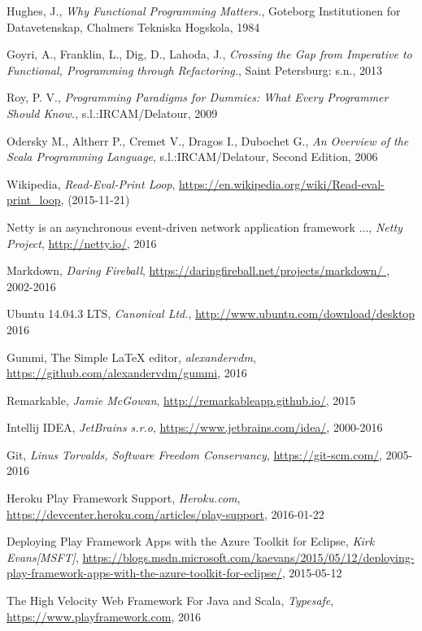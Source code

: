 \documentclass[12pt,twoside,a4paper]{report}
\begin{document}
\begin{thebibliography}{99}
Hughes, J.,
\emph{Why Functional Programming Matters.},
Goteborg Institutionen for Datavetenskap,
Chalmers Tekniska Hogskola, 1984


Goyri, A., Franklin, L., Dig, D., Lahoda, J.,
\emph{Crossing the Gap from Imperative to Functional, Programming through Refactoring.},
Saint Petersburg: s.n.,
2013

Roy, P. V.,
\emph{Programming Paradigms for Dummies: What Every Programmer Should Know.},
s.l.:IRCAM/Delatour,
2009

Odersky M., Altherr P., Cremet V., Dragos I., Dubochet G.,
\emph{An Overview of the Scala Programming Language},
s.l.:IRCAM/Delatour,
Second Edition,
2006

Wikipedia,
\emph{Read-Eval-Print Loop},
\url{https://en.wikipedia.org/wiki/Read-eval-print_loop},
(2015-11-21)

Netty is an asynchronous event-driven network application framework ...,
\emph{Netty Project},
\url{http://netty.io/},
2016

Markdown,
\emph{Daring Fireball},
\url{https://daringfireball.net/projects/markdown/	},
2002-2016

Ubuntu 14.04.3 LTS,
\emph{Canonical Ltd.},
\url{http://www.ubuntu.com/download/desktop}
2016

Gummi, The Simple LaTeX editor,
\emph{alexandervdm},
\url{https://github.com/alexandervdm/gummi},
2016

Remarkable,
\emph{Jamie McGowan},
\url{http://remarkableapp.github.io/},
2015

Intellij IDEA,
\emph{JetBrains s.r.o},
\url{https://www.jetbrains.com/idea/},
2000-2016

Git,
\emph{Linus Torvalds, Software Freedom Conservancy},
\url{https://git-scm.com/},
2005-2016

Heroku Play Framework Support,
\emph{Heroku.com},
\url{https://devcenter.heroku.com/articles/play-support},
2016-01-22

Deploying Play Framework Apps with the Azure Toolkit for Eclipse,
\emph{Kirk Evans[MSFT]},
\url{https://blogs.msdn.microsoft.com/kaevans/2015/05/12/deploying-play-framework-apps-with-the-azure-toolkit-for-eclipse/},
2015-05-12

The High Velocity Web Framework For Java and Scala,
\emph{Typesafe},
\url{https://www.playframework.com},
2016


\end{thebibliography}
\end{document}
